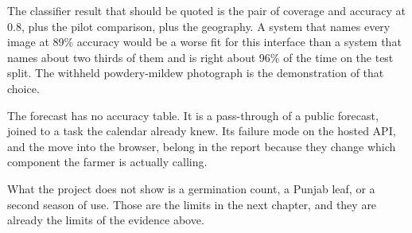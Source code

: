 The classifier result that should be quoted is the pair of coverage and accuracy at 0.8, plus the pilot comparison, plus the geography. A system that names every image at 89\% accuracy would be a worse fit for this interface than a system that names about two thirds of them and is right about 96\% of the time on the test split. The withheld powdery-mildew photograph is the demonstration of that choice.

The forecast has no accuracy table. It is a pass-through of a public forecast, joined to a task the calendar already knew. Its failure mode on the hosted API, and the move into the browser, belong in the report because they change which component the farmer is actually calling.

What the project does not show is a germination count, a Punjab leaf, or a second season of use. Those are the limits in the next chapter, and they are already the limits of the evidence above.
